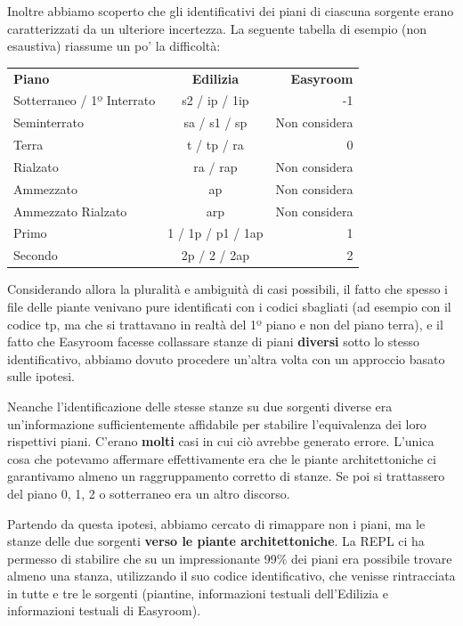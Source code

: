 \documentclass[12pt]{report}
\begin{document}
Inoltre abbiamo scoperto che gli identificativi dei piani di ciascuna sorgente
erano caratterizzati da un ulteriore incertezza. La seguente 
tabella di esempio (non esaustiva) riassume un po' la difficoltà:

\vspace{1cm}
\begin{tabular}{ l c r }
  \hline
  \textbf{Piano}              & \textbf{Edilizia} & \textbf{Easyroom}    \\
  Sotterraneo / 1º Interrato  & s2 / ip / 1ip     & -1                   \\
  Seminterrato                & sa / s1 / sp      & Non considera        \\
  Terra                       & t / tp / ra       & 0                    \\
  Rialzato                    & ra / rap          & Non considera        \\
  Ammezzato                   & ap                & Non considera        \\
  Ammezzato Rialzato          & arp               & Non considera        \\
  Primo                       & 1 / 1p / p1 / 1ap & 1                    \\
  Secondo                     & 2p / 2 / 2ap      & 2                    \\
  \hline
\end{tabular}
\vspace{1cm}

Considerando allora la pluralità e ambiguità di casi possibili,
il fatto che spesso i file delle piante venivano pure identificati 
con i codici sbagliati (ad esempio con il codice tp,
ma che si trattavano in realtà del 1º piano e non del piano terra), 
e il fatto che Easyroom facesse collassare stanze di piani 
\textbf{diversi} sotto lo stesso identificativo, abbiamo dovuto 
procedere un'altra volta con un approccio basato sulle ipotesi.

Neanche l'identificazione delle stesse stanze su due sorgenti diverse
era un'informazione sufficientemente affidabile per stabilire l'equivalenza
dei loro rispettivi piani. C'erano \textbf{molti} casi in cui ciò 
avrebbe generato errore. L'unica cosa che potevamo affermare effettivamente
era che le piante architettoniche ci garantivamo almeno un raggruppamento
corretto di stanze. Se poi si trattassero del piano 0, 1, 2 o sotterraneo
era un altro discorso.

Partendo da questa ipotesi, abbiamo cercato di rimappare non i piani, ma 
le stanze delle due sorgenti \textbf{verso le piante architettoniche}.
La REPL ci ha permesso di stabilire che su un impressionante
99\% dei piani era possibile trovare almeno una stanza, utilizzando il
suo codice identificativo, che venisse rintracciata in tutte e tre le
sorgenti (piantine, informazioni testuali dell'Edilizia e informazioni
testuali di Easyroom). 
\end{document}
